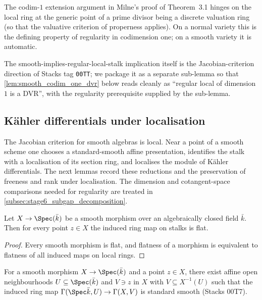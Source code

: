 The codim-\(1\) extension argument in Milne's proof of Theorem~3.1 hinges on the local
ring at the generic point of a prime divisor being a discrete valuation ring (so that
the valuative criterion of properness applies). On a normal variety this is the
defining property of regularity in codimension one; on a smooth variety it is automatic.

The smooth-implies-regular-local-stalk implication itself is the Jacobian-criterion
direction of Stacks tag \texttt{00TT}; we package it as a separate sub-lemma so that
\cref{lem:smooth_codim_one_dvr} below reads cleanly as ``regular local of dimension
\(1\) is a DVR'', with the regularity prerequisite supplied by the sub-lemma.

\subsection{K\"ahler differentials under localisation}
\label{subsec:kaehler_localisation_substrate}

The Jacobian criterion for smooth algebras is local.  Near a point of a smooth
scheme one chooses a standard-smooth affine presentation, identifies the stalk
with a localisation of its section ring, and localises the module of K\"ahler
differentials.  The next lemmas record these reductions and the preservation of
freeness and rank under localisation.  The dimension and cotangent-space
comparisons needed for regularity are treated in
\cref{subsec:stage6_subgap_decomposition}.

\begin{lemma}\leanok
  \label{lem:stalkMap_flat_of_smooth}
  Let \(X \to \Spec(\bar k)\) be a smooth morphism over an algebraically closed
  field \(\bar k\). Then for every point \(z \in X\) the induced ring map on
  stalks is flat.
\end{lemma}

\begin{proof}
  Every smooth morphism is flat, and flatness of a morphism is equivalent to
  flatness of all induced maps on local rings.
\end{proof}

\begin{lemma}\leanok
  \label{lem:exists_standardSmooth_at_of_smooth}
  For a smooth morphism \(X \to \Spec(\bar k)\) and a point \(z \in X\), there
  exist affine open neighbourhoods \(U \subseteq \Spec(\bar k)\) and \(V \ni z\)
  in \(X\) with \(V \subseteq X^{-1}(U)\) such that the induced ring map
  \(\Gamma(\Spec \bar k, U) \to \Gamma(X, V)\) is standard smooth (Stacks 00T7).
\end{lemma}

